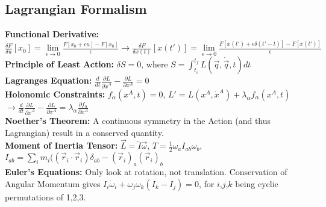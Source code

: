 \documentclass[12pt]{extarticle}
\begin{document}
\subsection*{Lagrangian Formalism}
\textbf{Functional Derivative:} $\frac{\delta F}{\delta u}[x_0] = \lim\limits_{\epsilon \rightarrow 0} \frac{F[x_0+\epsilon u] - F[x_0]}{\epsilon} \rightarrow \frac{\delta F}{\delta x(t)}[x(t')] = \lim\limits_{\epsilon \rightarrow 0} \frac{F[x(t')+\epsilon \delta(t'-t)] - F[x(t')]}{\epsilon}$ \\
\textbf{Principle of Least Action:} $\delta S = 0$, where $S=\int_{t_i}^{t_f} L(\vec{q},\dot{\vec{q}},t) dt$ \\
\textbf{Lagranges Equation:} $\frac{d}{dt}\frac{\partial L}{\partial \dot{x}^A}-\frac{\partial L}{\partial x^A} = 0$ \\
\textbf{Holonomic Constraints: } $f_\alpha(x^A,t) = 0$, $L' = L(x^A,\dot{x}^A) + \lambda_\alpha f_\alpha(x^A,t)$ $\rightarrow \frac{d}{dt}\frac{\partial L}{\partial \dot{x}^A}-\frac{\partial L}{\partial x^A} = \lambda_\alpha \frac{\partial f_\alpha}{\partial x^A}$ \\
\textbf{Noether's Theorem: } A continuous symmetry in the Action (and thus Lagrangian) result in a conserved quantity. \\
\textbf{Moment of Inertia Tensor: } $\vec{L} = \overleftrightarrow{I} \vec{\omega}$, $T = \frac{1}{2} \omega_a I_{ab} \omega_b$, $I_{ab} = \sum_i m_i((\vec{r}_i \cdot \vec{r}_i)\delta_{ab} - (\vec{r}_i)_a(\vec{r}_i)_b$ \\
\textbf{Euler's Equations:} Only look at rotation, not translation. Conservation of Angular Momentum gives $I_i\dot{\omega}_i +\omega_j\omega_k(I_k-I_j) = 0$, for $i$,$j$,$k$ being cyclic permutations of 1,2,3. \\
\end{document}
